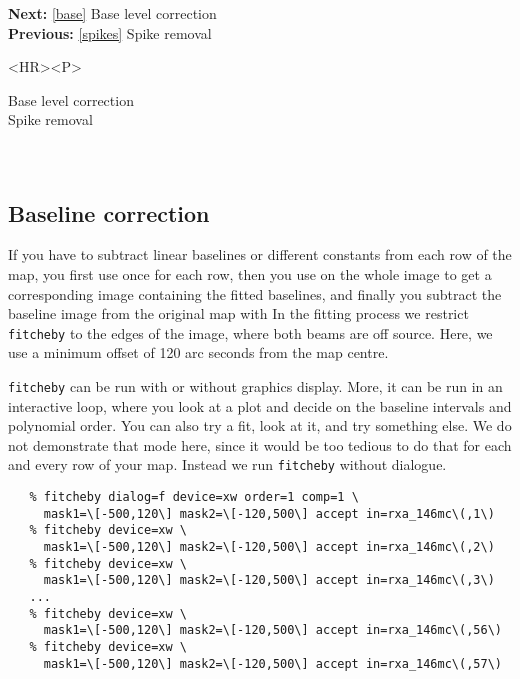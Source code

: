 \begin{latexonly}
{\bf Next:} \ref{base} Base level correction\\
{\bf Previous:} \ref{spikes} Spike removal\\
\end{latexonly}

\begin{htmlonly}
\begin{rawhtml} <HR><P> \end{rawhtml}
{\bf {}} Base level correction\\
{\bf {}} Spike removal\\
{\bf {}}\\
{\bf {}}\\
\end{htmlonly}


\subsection{\label{base2}Baseline correction}

   If you have to subtract linear baselines or different constants from
   each row of the map, you first use
{\tt {}}
   once for each row, then you use
{\tt {}}
   on the whole image to get a corresponding image containing the fitted
   baselines, and finally you subtract the baseline image from the
   original map with
{\tt {}}
   In the fitting process we restrict {\tt fitcheby} to the edges of
   the image, where both beams are off source. Here, we use a minimum
   offset of 120 arc seconds from the map centre.

   {\tt fitcheby} can be run with or without graphics display. More,
   it can be run in an interactive loop, where you look at a plot and
   decide on the baseline intervals and polynomial order. You can also
   try a fit, look at it, and try something else. We do not demonstrate
   that mode here, since it would be too tedious to do that for each and
   every row of your map. Instead we run {\tt fitcheby} without
   dialogue.

\begin{verbatim}
   % fitcheby dialog=f device=xw order=1 comp=1 \
     mask1=\[-500,120\] mask2=\[-120,500\] accept in=rxa_146mc\(,1\)
   % fitcheby device=xw \
     mask1=\[-500,120\] mask2=\[-120,500\] accept in=rxa_146mc\(,2\)
   % fitcheby device=xw \
     mask1=\[-500,120\] mask2=\[-120,500\] accept in=rxa_146mc\(,3\)
   ...
   % fitcheby device=xw \
     mask1=\[-500,120\] mask2=\[-120,500\] accept in=rxa_146mc\(,56\)
   % fitcheby device=xw \
     mask1=\[-500,120\] mask2=\[-120,500\] accept in=rxa_146mc\(,57\)
\end{verbatim}

